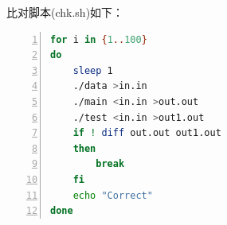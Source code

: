 \documentclass{article}
\begin{document}
比对脚本(chk.sh)如下：

\begin{lstlisting}[language={bash},
    numbers=left,
    numberstyle=\tiny\consolas,
    basicstyle=\small\consolas]
for i in {1..100}
do
    sleep 1
    ./data >in.in
    ./main <in.in >out.out
    ./test <in.in >out1.out
    if ! diff out.out out1.out
    then
        break
    fi
    echo "Correct"
done
\end{lstlisting}
\end{document}
